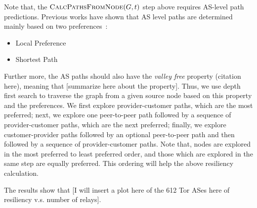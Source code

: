 Note that, the $\Call{CalcPathsFromNode}{G,t}$ step above requires AS-level path predictions. Previous works have shown that AS level paths are determined mainly based on two preferences~\cite{starov2015measuring}:

\begin{itemize}
\item Local Preference
\item Shortest Path
\end{itemize}

Further more, the AS paths should also have the \emph{valley free} property (citation here), meaning that  [summarize here about the property]. Thus, we use depth first search to traverse the graph from a given source node based on this property and the preferences. We first explore provider-customer paths, which are the most preferred; next, we explore one peer-to-peer path followed by a sequence of provider-customer paths, which are the next preferred; finally, we explore customer-provider paths followed by an optional peer-to-peer path and then followed by a sequence of provider-customer paths. Note that, nodes are explored in the most preferred to least preferred order, and those which are explored in the same step are equally preferred. This ordering will help the above resiliency calculation. 
\\
\begin{algorithmic}
	\State [to be filled]
\EndFunction
\end{algorithmic}

The results show that [I will insert a plot here of the 612 Tor ASes here of resiliency v.s. number of relays].
